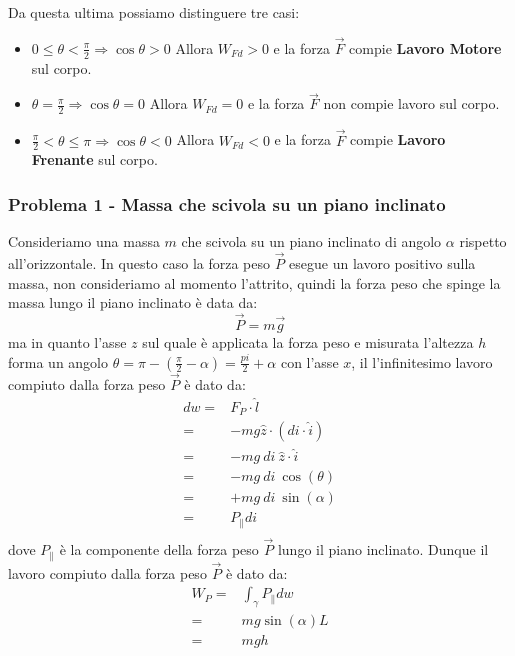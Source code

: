     Da questa ultima possiamo distinguere tre casi:
    \begin{itemize}
        \item $0\leq \theta < \frac{\pi}2 \Rightarrow \cos \theta > 0$ Allora $W_{Fd} > 0$ e la forza $\vec{F}$ compie \textbf{Lavoro Motore} sul corpo.
        \item $\theta = \frac{\pi}2 \Rightarrow \cos \theta = 0$ Allora $W_{Fd} = 0$ e la forza $\vec{F}$ non compie lavoro sul corpo.
        \item $\frac{\pi}2 < \theta \leq \pi \Rightarrow \cos \theta < 0$ Allora $W_{Fd} < 0$ e la forza $\vec{F}$ compie \textbf{Lavoro Frenante} sul corpo.
    \end{itemize}
    \subsubsection{Problema 1 - Massa che scivola su un piano inclinato}
        Consideriamo una massa $m$ che scivola su un piano inclinato di angolo $\alpha$ rispetto all'orizzontale.\newline
        In questo caso la forza peso $\vec{P}$ esegue un lavoro positivo sulla massa, non consideriamo al momento l'attrito, quindi la forza peso che spinge la massa lungo il piano inclinato è data da:
        $$
            \vec{P} = m\vec{g}
        $$
        ma in quanto l'asse $z$ sul quale è applicata la forza peso e misurata l'altezza $h$ forma un angolo $\theta=\pi-\left(\frac{\pi}2-\alpha\right) = \frac{pi}{2}+\alpha$ con l'asse $x$, il l'infinitesimo lavoro compiuto dalla forza peso $\vec{P}$ è dato da:
        $$
            \begin{aligned}
                dw=& F_{P} \cdot \hat{l} \\
                =& -mg\hat{z} \cdot (di\cdot \hat{i})\\
                =& -mg\ di\ \hat{z} \cdot \hat{i}\\
                =& -mg\ di\ \cos(\theta)\\
                =& +mg\ di\ \sin(\alpha)\\
                =& P_{\parallel} di\\
            \end{aligned}
        $$
        dove $P_{\parallel}$ è la componente della forza peso $\vec{P}$ lungo il piano inclinato. Dunque il lavoro compiuto dalla forza peso $\vec{P}$ è dato da:
        $$
            \begin{aligned}
                W_{P} =& \int_{\gamma} P_{\parallel} dw\\
                =& mg\sin(\alpha) L\\
                =& mg h
            \end{aligned}
        $$
